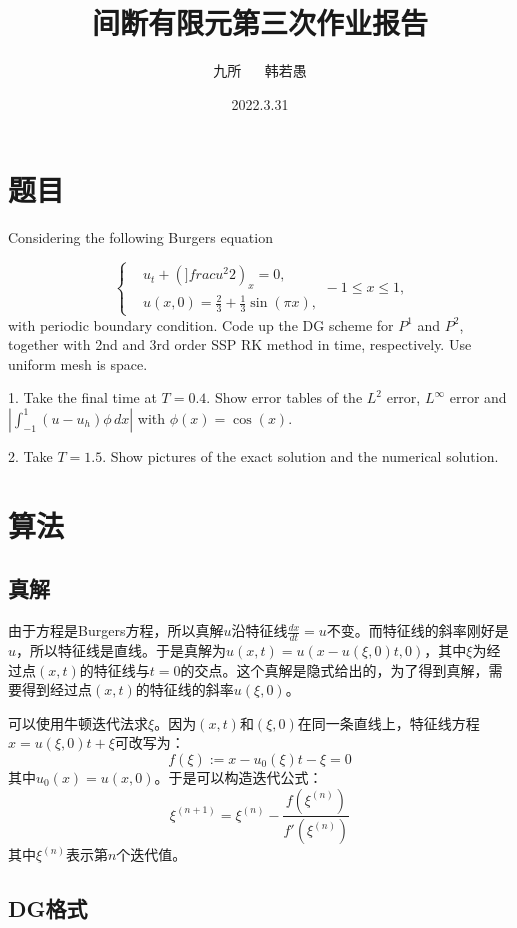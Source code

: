\documentclass[12pt, a4paper]{ctexart}
\title{间断有限元第三次作业报告}
\author{九所 $\quad$ 韩若愚}
\date{2022.3.31}
\begin{document}
	\maketitle
	
	\section{题目}
	
	Considering the following Burgers equation
	
	\begin{equation}
	\begin{cases}
	& u_t + (]frac{u^2}{2})_x = 0,\\
	& u(x,0) = \frac{2}{3} + \frac{1}{3} \sin (\pi x),
	\end{cases}
	-1 \leq x \leq 1,
	\end{equation}
	with periodic boundary condition. Code up the DG scheme for $P^1$ and $P^2$, together with 2nd and 3rd order SSP RK method in time, respectively. Use uniform mesh is space.
	
	1. Take the final time at $T = 0.4$. Show error tables of the $L^2$ error, $L^\infty$ error and $|\int_{-1}^1 (u-u_h)\phi \, dx|$ with $\phi(x) = \cos(x)$.
	
	2. Take $T=1.5$. Show pictures of the exact solution and the numerical solution.
	
	\section{算法}
	
	\subsection{真解}
	
	由于方程是Burgers方程，所以真解$u$沿特征线$ \frac{dx}{dt} = u$不变。而特征线的斜率刚好是$u$，所以特征线是直线。于是真解为$u(x,t) = u(x- u(\xi,0)t,0)$，其中$\xi$为经过点$(x,t)$的特征线与$t=0$的交点。这个真解是隐式给出的，为了得到真解，需要得到经过点$(x,t)$的特征线的斜率$u(\xi,0)$。
	
	可以使用牛顿迭代法求$\xi$。因为$(x,t)$和$(\xi,0)$在同一条直线上，特征线方程$x = u(\xi,0)t+\xi$可改写为：
	$$
	f(\xi) := x - u_0(\xi) t - \xi = 0
	$$
	其中$u_0(x) = u(x,0)$。于是可以构造迭代公式：
	$$
	\xi^{(n+1)} = \xi^{(n)} - \frac{f(\xi^{(n)})}{f'(\xi^{(n)})}
	$$
	其中$\xi^{(n)}$表示第$n$个迭代值。
	
	\subsection{DG格式}
	
\end{document}
